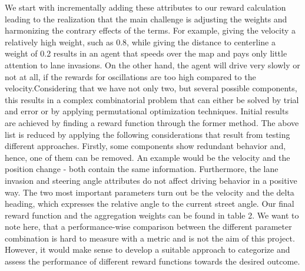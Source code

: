 \documentclass[letterpaper, 10 pt, conference]{ieeeconf}  %
\begin{document}
We start with incrementally adding these attributes to our reward calculation leading to the realization that the main challenge is adjusting the weights and harmonizing the contrary effects of the terms.
For example, giving the velocity a relatively high weight, such as 0.8, while giving the distance to centerline a weight of 0.2 results in an agent that speeds over the map and pays only little attention to lane invasions. On the other hand, the agent will drive very slowly or not at all, if the rewards for oscillations are too high compared to the velocity.Considering that we have not only two, but several possible components, this results in a complex combinatorial problem that can either be solved by trial and error or by applying permutational optimization techniques. Initial results are achieved by finding a reward function through the former method. 
\newline
The above list is reduced by applying the following considerations that result from testing different approaches. Firstly, some components show redundant behavior and, hence, one of them can be removed. An example would be the velocity and the position change - both contain the same information. Furthermore, the lane invasion and steering angle attributes do not affect driving behavior in a positive way. The two most important parameters turn out be the velocity and the delta heading, which expresses the relative angle to the current street angle. Our final reward function and the aggregation weights can be found in table 2.
\newline
We want to note here, that a performance-wise comparison between the different parameter combination is hard to measure with a metric and is not the aim of this project. However, it would make sense to develop a suitable approach to categorize and assess the performance of different reward functions towards the desired outcome. 
\end{document}
